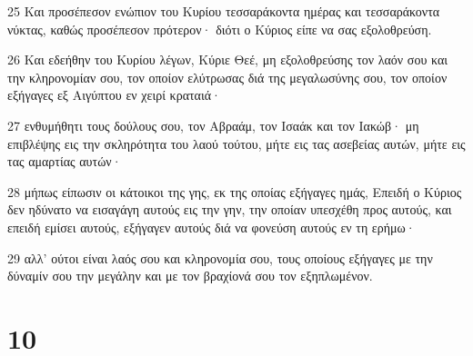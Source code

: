 \par 25 Και προσέπεσον ενώπιον του Κυρίου τεσσαράκοντα ημέρας και τεσσαράκοντα νύκτας, καθώς προσέπεσον πρότερον· διότι ο Κύριος είπε να σας εξολοθρεύση.
\par 26 Και εδεήθην του Κυρίου λέγων, Κύριε Θεέ, μη εξολοθρεύσης τον λαόν σου και την κληρονομίαν σου, τον οποίον ελύτρωσας διά της μεγαλωσύνης σου, τον οποίον εξήγαγες εξ Αιγύπτου εν χειρί κραταιά·
\par 27 ενθυμήθητι τους δούλους σου, τον Αβραάμ, τον Ισαάκ και τον Ιακώβ· μη επιβλέψης εις την σκληρότητα του λαού τούτου, μήτε εις τας ασεβείας αυτών, μήτε εις τας αμαρτίας αυτών·
\par 28 μήπως είπωσιν οι κάτοικοι της γης, εκ της οποίας εξήγαγες ημάς, Επειδή ο Κύριος δεν ηδύνατο να εισαγάγη αυτούς εις την γην, την οποίαν υπεσχέθη προς αυτούς, και επειδή εμίσει αυτούς, εξήγαγεν αυτούς διά να φονεύση αυτούς εν τη ερήμω·
\par 29 αλλ' ούτοι είναι λαός σου και κληρονομία σου, τους οποίους εξήγαγες με την δύναμίν σου την μεγάλην και με τον βραχίονά σου τον εξηπλωμένον.

\chapter{10}

